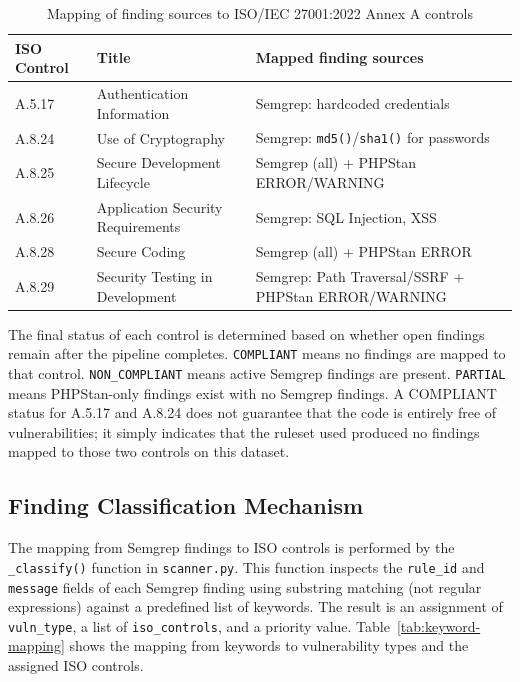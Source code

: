\begin{table}[htbp]
\caption{Mapping of finding sources to ISO/IEC 27001:2022 Annex A controls}
\vspace{0.5em}
\centering
\label{tab:iso-mapping}
\renewcommand{\arraystretch}{1.4}
\begin{tabularx}{\textwidth}{|l|l|>{\raggedright\arraybackslash}X|}
\hline
\textbf{ISO Control} & \textbf{Title} & \textbf{Mapped finding sources} \\
\hline \hline
A.5.17 & Authentication Information & Semgrep: hardcoded credentials \\
\hline
A.8.24 & Use of Cryptography & Semgrep: \texttt{md5()}/\texttt{sha1()} for passwords \\
\hline
A.8.25 & Secure Development Lifecycle & Semgrep (all) + PHPStan ERROR/WARNING \\
\hline
A.8.26 & Application Security Requirements & Semgrep: SQL Injection, XSS \\
\hline
A.8.28 & Secure Coding & Semgrep (all) + PHPStan ERROR \\
\hline
A.8.29 & Security Testing in Development & Semgrep: Path Traversal/SSRF + PHPStan ERROR/WARNING \\
\hline
\end{tabularx}
\end{table}

The final status of each control is determined based on whether open findings remain after the pipeline completes. \texttt{COMPLIANT} means no findings are mapped to that control. \texttt{NON\_COMPLIANT} means active Semgrep findings are present. \texttt{PARTIAL} means PHPStan-only findings exist with no Semgrep findings. A COMPLIANT status for A.5.17 and A.8.24 does not guarantee that the code is entirely free of vulnerabilities; it simply indicates that the ruleset used produced no findings mapped to those two controls on this dataset.

\newpage
\subsection{Finding Classification Mechanism}

The mapping from Semgrep findings to ISO controls is performed by the \texttt{\_classify()} function in \texttt{scanner.py}. This function inspects the \texttt{rule\_id} and \texttt{message} fields of each Semgrep finding using substring matching (not regular expressions) against a predefined list of keywords. The result is an assignment of \texttt{vuln\_type}, a list of \texttt{iso\_controls}, and a priority value. Table~\ref{tab:keyword-mapping} shows the mapping from keywords to vulnerability types and the assigned ISO controls.

